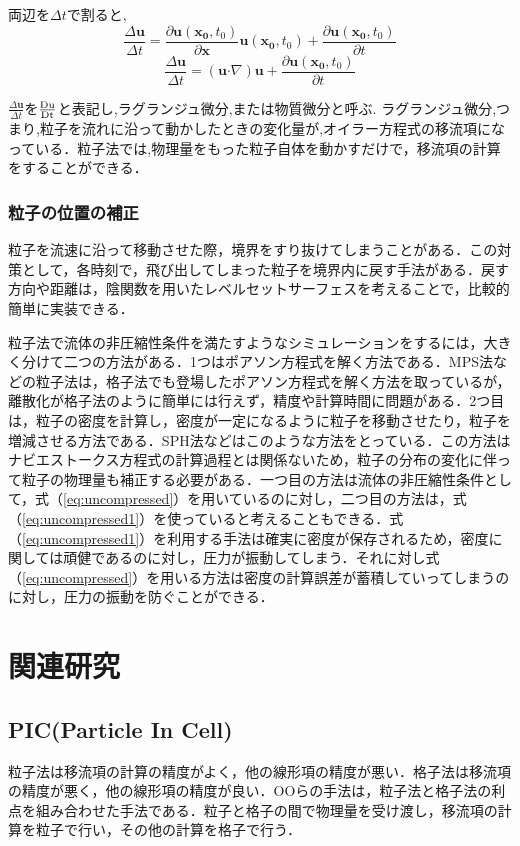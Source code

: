 \documentclass[a4j,12pt]{jreport}
\begin{document}
両辺を$\Delta t$で割ると,
$$ \frac{\Delta \bm{u}}{\Delta t} = \frac{\partial \bm{u}(\bm{x_0},t_0)}{\partial \bm{x}}\bm{u}(\bm{x_0},t_0) + \frac{\partial \bm{u}(\bm{x_0},t_0)}{\partial t}$$
$$ \frac{\Delta \bm{u}}{\Delta t} = (\bm{u}\boldsymbol{\cdot}\nabla)\bm{u} + \frac{\partial \bm{u}(\bm{x_0},t_0)}{\partial t}$$

$\frac{\Delta \bm{u}}{\Delta t}$を$\frac{\rm{D}\bm{u}}{\rm{D}t}$と表記し,ラグランジュ微分,または物質微分と呼ぶ.
ラグランジュ微分,つまり,粒子を流れに沿って動かしたときの変化量が,オイラー方程式の移流項になっている．粒子法では,物理量をもった粒子自体を動かすだけで，移流項の計算をすることができる．

\subsubsection{粒子の位置の補正} \label{subsec:fixparticlepos}
粒子を流速に沿って移動させた際，境界をすり抜けてしまうことがある．この対策として，各時刻で，飛び出してしまった粒子を境界内に戻す手法がある．戻す方向や距離は，陰関数を用いたレベルセットサーフェスを考えることで，比較的簡単に実装できる．

粒子法で流体の非圧縮性条件を満たすようなシミュレーションをするには，大きく分けて二つの方法がある．1つはポアソン方程式を解く方法である．MPS法などの粒子法は，格子法でも登場したポアソン方程式を解く方法を取っているが，離散化が格子法のように簡単には行えず，精度や計算時間に問題がある．2つ目は，粒子の密度を計算し，密度が一定になるように粒子を移動させたり，粒子を増減させる方法である．SPH法などはこのような方法をとっている．この方法はナビエストークス方程式の計算過程とは関係ないため，粒子の分布の変化に伴って粒子の物理量も補正する必要がある．一つ目の方法は流体の非圧縮性条件として，式（\ref{eq:uncompressed}）を用いているのに対し，二つ目の方法は，式（\ref{eq:uncompressed1}）を使っていると考えることもできる．式（\ref{eq:uncompressed1}）を利用する手法は確実に密度が保存されるため，密度に関しては頑健であるのに対し，圧力が振動してしまう．それに対し式（\ref{eq:uncompressed}）を用いる方法は密度の計算誤差が蓄積していってしまうのに対し，圧力の振動を防ぐことができる．

\section{関連研究} \label{sec:reratedworks}
\subsection{PIC(Particle In Cell)} \label{subsec:PIC}
粒子法は移流項の計算の精度がよく，他の線形項の精度が悪い．格子法は移流項の精度が悪く，他の線形項の精度が良い．OOらの手法は，粒子法と格子法の利点を組み合わせた手法である．粒子と格子の間で物理量を受け渡し，移流項の計算を粒子で行い，その他の計算を格子で行う．
\end{document}
